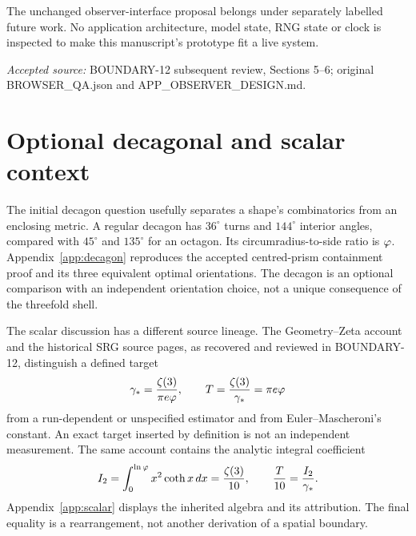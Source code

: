\documentclass[11pt,a4paper]{article}
\newcommand{\source}[1]{\par{\small\emph{Accepted source:} #1}\par}
\begin{document}
The unchanged observer-interface proposal belongs under separately labelled future work. No application architecture, model state, RNG state or clock is inspected to make this manuscript's prototype fit a live system.
\source{BOUNDARY-12 subsequent review, Sections 5--6; original BROWSER\_QA.json and APP\_OBSERVER\_DESIGN.md.}

\section{Optional decagonal and scalar context}\label{sec:context}
The initial decagon question usefully separates a shape's combinatorics from an enclosing metric. A regular decagon has $36^\circ$ turns and $144^\circ$ interior angles, compared with $45^\circ$ and $135^\circ$ for an octagon. Its circumradius-to-side ratio is $\varphi$. Appendix~\ref{app:decagon} reproduces the accepted centred-prism containment proof and its three equivalent optimal orientations. The decagon is an optional comparison with an independent orientation choice, not a unique consequence of the threefold shell.

The scalar discussion has a different source lineage. The Geometry--Zeta account and the historical SRG source pages, as recovered and reviewed in BOUNDARY-12, distinguish a defined target
\begin{equation}\label{eq:target}
\gamma_* = \frac{\zeta(3)}{\pi e\varphi},\qquad T=\frac{\zeta(3)}{\gamma_*}=\pi e\varphi
\end{equation}
from a run-dependent or unspecified estimator and from Euler--Mascheroni's constant. An exact target inserted by definition is not an independent measurement. The same account contains the analytic integral coefficient
\begin{equation}\label{eq:integral}
I_2=\int_0^{\ln\varphi}x^2\coth x\,dx=\frac{\zeta(3)}{10},\qquad
\frac T{10}=\frac{I_2}{\gamma_*}.
\end{equation}
Appendix~\ref{app:scalar} displays the inherited algebra and its attribution. The final equality is a rearrangement, not another derivation of a spatial boundary.
\end{document}
